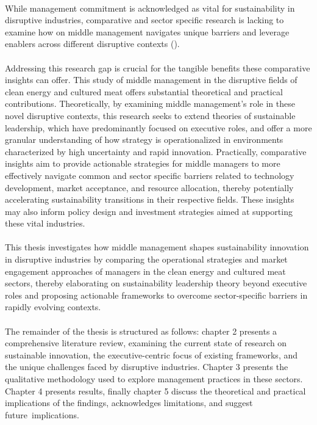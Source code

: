 \paragraph*{} While management commitment is acknowledged as vital for sustainability in disruptive industries, comparative and sector specific research is lacking to examine how on middle management navigates unique barriers and leverage enablers across different disruptive contexts (\textcite{Lozano2015, Egri2000}).

\paragraph*{} Addressing this research gap is crucial for the tangible benefits these comparative insights can offer. This study of middle management in the disruptive fields of clean energy and cultured meat offers substantial theoretical and practical contributions. Theoretically, by examining middle management's role in these novel disruptive contexts, this research seeks to extend theories of sustainable leadership, which have predominantly focused on executive roles, and offer a more granular understanding of how strategy is operationalized in environments characterized by high uncertainty and rapid innovation. Practically, comparative insights aim to provide actionable strategies for middle managers to more effectively navigate common and sector specific barriers related to technology development, market acceptance, and resource allocation, thereby potentially accelerating sustainability transitions in their respective fields. These insights may also inform policy design and investment strategies aimed at supporting these vital industries. 

\paragraph*{}This thesis investigates how middle management shapes sustainability innovation in disruptive industries by comparing the operational strategies and market engagement approaches of managers in the clean energy and cultured meat sectors, thereby elaborating on sustainability leadership theory beyond executive roles and proposing actionable frameworks to overcome sector-specific barriers in rapidly evolving contexts. 

\paragraph*{} The remainder of the thesis is structured as follows: chapter 2 presents a comprehensive literature review, examining the current state of research on sustainable innovation, the executive-centric focus of existing frameworks, and the unique challenges faced by disruptive industries. Chapter 3 presents the qualitative methodology used to explore management practices in these sectors. Chapter 4 presents results, finally chapter 5 discuss the theoretical and practical implications of the findings, acknowledges limitations, and suggest future implications.
